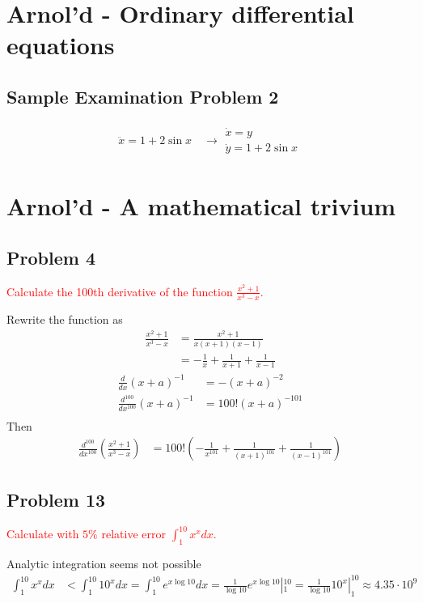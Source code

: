 \documentclass[../main.tex]{subfiles}
\begin{document}
\section{{\sc Arnol'd} - Ordinary differential equations}
\subsection{Sample Examination Problem 2}
\begin{align}
\ddot x=1+2\sin x\quad\rightarrow
\begin{array}{l}
\dot x=y\\
\dot y=1+2\sin x
\end{array}
\end{align}

\section{{\sc Arnol'd} - A mathematical trivium}
\subsection{Problem 4}
\textcolor{red}{Calculate the 100th derivative of the function $\frac{x^2+1}{x^3-x}$.}

Rewrite the function as
\begin{align}
    \frac{x^2+1}{x^3-x}&=\frac{x^2+1}{x(x+1)(x-1)}\\
    &=-\frac{1}{x}+\frac{1}{x+1}+\frac{1}{x-1}
\end{align}
\begin{align}
    \frac{d}{dx}(x+a)^{-1}&=-(x+a)^{-2}\\
    \frac{d^{100}}{dx^{100}}(x+a)^{-1}&=100!(x+a)^{-101}\\
\end{align}
Then
\begin{align}
    \frac{d^{100}}{dx^{100}}\left(\frac{x^2+1}{x^3-x}\right)&=100!\left(-\frac{1}{x^{101}}+\frac{1}{(x+1)^{101}}+\frac{1}{(x-1)^{101}}\right)
\end{align}

\subsection{Problem 13}
\textcolor{red}{Calculate with $5\%$ relative error $\int_1^{10} x^x dx$.}

Analytic integration seems not possible 
\begin{align}
    \int_1^{10} x^x dx&<\int_1^{10} 10^x dx=\int_1^{10} e^{x\log10} dx=\frac{1}{\log 10}e^{x\log10}|_1^{10}=\frac{1}{\log 10}10^x|_1^{10}\approx4.35\cdot10^{9}
\end{align}
\end{document}
